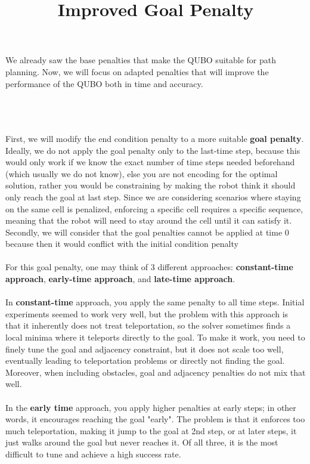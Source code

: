 \documentclass[11pt]{article}
\begin{document}
We already saw the base penalties that make the QUBO suitable for path planning. Now, we will focus on adapted penalties that will improve the performance of the QUBO both in time and accuracy.\\
\\
\title{\textbf{Improved Goal Penalty}}
\\\\
First, we will modify the end condition penalty to a more suitable \textbf{goal penalty}. Ideally, we do not apply the goal penalty only to the last-time step, because this would only work if we know the exact number of time steps needed beforehand (which usually we do not know), else you are not encoding for the optimal solution, rather you would be constraining by making the robot think it should only reach the goal at last step. Since we are considering scenarios where staying on the same cell is penalized, enforcing a specific cell requires a specific sequence, meaning that the robot will need to stay around the cell until it can satisfy it. Secondly, we will consider that the goal penalties cannot be applied at time 0 because then it would conflict with the initial condition penalty\\
\\
For this goal penalty, one may think of 3 different approaches: \textbf{constant-time approach}, \textbf{early-time approach}, and \textbf{late-time approach}.\\
\\
In \textbf{constant-time} approach, you apply the same penalty to all time steps. Initial experiments seemed to work very well, but the problem with this approach is that it inherently does not treat teleportation, so the solver sometimes finds a local minima where it teleports directly to the goal. To make it work, you need to finely tune the goal and adjacency constraint, but it does not scale too well, eventually leading to teleportation problems or directly not finding the goal. Moreover, when including obstacles, goal and adjacency penalties do not mix that well.\\
\\
In the \textbf{early time} approach, you apply higher penalties at early steps; in other words, it encourages reaching the goal "early". The problem is that it enforces too much teleportation, making it jump to the goal at 2nd step, or at later steps, it just walks around the goal but never reaches it. Of all three, it is the most difficult to tune and achieve a high success rate.\\
\end{document}
